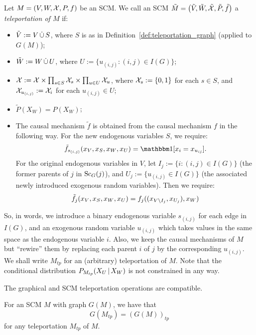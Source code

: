 \begin{Def}\label{def:teleportation_scm}
  Let $M = \left ( V,W,\mathcal{X},P,f \right )$ be an SCM.
  We call an SCM $\tilde{M} = \left ( \tilde{V},\tilde{W},\tilde{\mathcal{X}},\tilde{P},\tilde{f} \right )$ a \emph{teleportation of $M$} if:
  \begin{itemize}
    \item $\tilde{V} := V \,\dot{\cup}\, S$, where $S$ is as in Definition~\ref{def:teleportation_graph} (applied to $G(M)$);
    \item $\tilde{W} := W \,\dot{\cup}\, U$, where $U := \{u_{(i,j)} : (i,j) \in I(G)\}$;
    \item $\mathcal{X} := \mathcal{X} \times \prod_{s \in S} \mathcal{X}_s \times \prod_{u \in U} \mathcal{X}_u$,
      where $\mathcal{X}_s := \{0,1\}$ for each $s \in S$, and $\mathcal{X}_{u_{(i,j)}} := \mathcal{X}_i$ for each $u_{(i,j)} \in U$;
    \item $\tilde{P}(X_W) = P(X_W)$;
    \item {}
      The causal mechanism $\tilde{f}$ is obtained from the causal mechanism $f$ in the following way.
      For the new endogenous variables $S$, we require:
        $$\tilde f_{s_{(i,j)}}(x_V,x_S,x_W,x_U) = \ind[x_i = x_{u_{ij}}].$$
        For the original endogenous variables in $V$, let $I_j := \{i : (i,j) \in I(G)\}$ (the former parents of $j$ in $\mathrm{Sc}_G(j)$), and $U_j := \{u_{(i,j)} \in I(G)\}$ (the associated newly introduced exogenous random variables).
      Then we require:
        $$\tilde f_j(x_V,x_S,x_W,x_U) = f_j((x_{V \setminus I_j},x_{U_j}),x_W)$$
  \end{itemize}
  So, in words, we introduce a binary endogenous variable $s_{(i,j)}$ for each edge in $I(G)$, and an exogenous random variable $u_{(i,j)}$ which takes values in the same space as the endogenous variable $i$.
  Also, we keep the causal mechanisms of $M$ but ``rewire'' them by replacing each parent $i$ of $j$ by the corresponding $u_{(i,j)}$.
  We shall write $M_{tp}$ for an (arbitrary) teleportation of $M$.
  Note that the conditional distribution $P_{M_{tp}}(X_U \operatorname*{|} X_W)$ is not constrained in any way.
\end{Def}
The graphical and SCM teleportation operations are compatible.
\begin{Prp}
  For an SCM $M$ with graph $G(M)$, we have that
  $$G(M_{tp}) = (G(M))_{tp}$$
  for any teleportation $M_{tp}$ of $M$.
\end{Prp}
